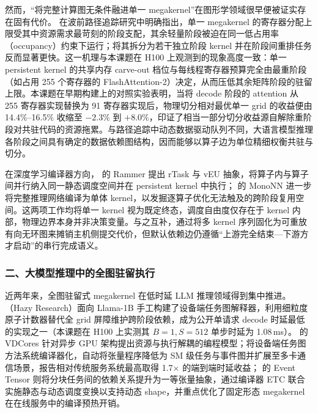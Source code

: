 然而，“将完整计算图无条件融进单一 megakernel”在图形学领域很早便被证实存在固有代价。 在波前路径追踪研究中明确指出，单一 megakernel 的寄存器分配上限受其中资源需求最苛刻的阶段支配，其余轻量阶段被迫在同一低占用率（occupancy）约束下运行；将其拆分为若干独立阶段 kernel 并在阶段间重排任务反而显著更快。这一机理与本课题在 H100 上观测到的现象高度一致：单一 persistent kernel 的共享内存 carve-out 档位与每线程寄存器预算完全由最重阶段（如占用 255 个寄存器的 FlashAttention-2）决定，从而压低其余矩阵阶段的驻留上限。本课题在早期构建上的对照实验表明，当将 decode 阶段的 attention 从 255 寄存器实现替换为 91 寄存器实现后，物理切分相对最优单一 grid 的收益便由 14.4\%--16.5\% 收缩至 $-2.3\%$ 到 $+8.0\%$，印证了相当一部分切分收益源自解除重阶段对共驻代码的资源拖累。与路径追踪中动态数据驱动队列不同，大语言模型推理各阶段之间具有确定的数据依赖图结构，因而能够以算子边为单位精细权衡共驻与切分。

在深度学习编译器方向， 的 Rammer 提出 rTask 与 vEU 抽象，将算子内与算子间并行纳入同一静态调度空间并在 persistent kernel 中执行； 的 MonoNN 进一步将完整推理网络编译为单体 kernel，以发掘逐算子优化无法触及的跨阶段复用空间。这两项工作均将单一 kernel 视为既定终态，调度自由度仅存在于 kernel 内部，物理边界本身并非决策变量。与之互补，\cGraph 通过将多 kernel 序列固化为可重放有向无环图来摊销主机侧提交代价，但默认依赖边仍遵循“上游完全结束—下游方才启动”的串行完成语义。

\subsubsection*{二、大模型推理中的全图驻留执行}

近两年来，全图驻留式 megakernel 在低时延 LLM 推理领域得到集中推进。（Hazy Research）面向 Llama-1B 手工构建了设备端任务图解释器，利用细粒度原子计数器替代全 grid 屏障维护跨阶段依赖，成为公开单请求 decode 时延最低的实现之一（本课题在 H100 上实测其 $B{=}1, S{=}512$ 单步时延为 1.08\,ms）。 的 VDCores 针对异步 GPU 架构提出资源与执行解耦的编程模型；\cMPK 将设备端任务图方法系统编译器化，自动将张量程序降低为 SM 级任务与事件图并扩展至多卡通信场景，报告相对传统服务系统最高取得 1.7$\times$ 的端到端时延收益； 的 Event Tensor 则将分块任务间的依赖关系提升为一等张量抽象，通过编译器 ETC 联合实施静态与动态调度变换以支持动态 shape，并重点优化了固定形态 megakernel 在在线服务中的编译预热开销。

